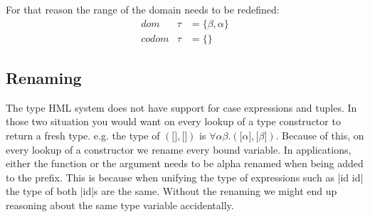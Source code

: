 For that reason the range of the domain needs to be redefined:
\begin{eqnarray*}
dom   &\tau& = \{\beta, \alpha\}\\
codom &\tau& = \{\}
\end{eqnarray*}

\subsection{Renaming}
\label{renaming}

The type HML system does not have support for case expressions and tuples. In those two situation you would want on every lookup of a type constructor to return a fresh type. e.g. the type of $(\lbrack \rbrack, \lbrack \rbrack)$ is $\forall \alpha \beta . (\lbrack \alpha \rbrack, \lbrack \beta \rbrack)$. Because of this, on every lookup of a constructor we rename every bound variable. In applications, either the function or the argument needs to be alpha renamed when being added to the prefix. This is because when unifying the type of expressions such as |id id| the type of both |id|s are the same. Without the renaming we might end up reasoning about the same type variable accidentally.
